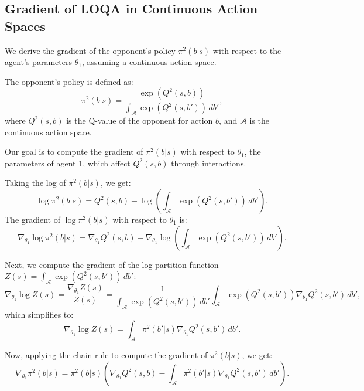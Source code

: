 \documentclass{article} \usepackage{iclr2025_conference,times}
\begin{document}
\subsection{Gradient of LOQA in Continuous Action Spaces}
\label{app:LOQA_continuous}

We derive the gradient of the opponent's policy \( \pi^2(b | s) \) with respect to the agent’s parameters \( \theta_1 \), assuming a continuous action space.

The opponent's policy is defined as:
\begin{equation}
    \pi^2(b | s) = \frac{\exp(Q^2(s, b))}{\int_{\mathcal{A}} \exp(Q^2(s, b')) \, db'},
\end{equation}
where \( Q^2(s, b) \) is the Q-value of the opponent for action \( b \), and \( \mathcal{A} \) is the continuous action space. 

Our goal is to compute the gradient of \( \pi^2(b | s) \) with respect to \( \theta_1 \), the parameters of agent 1, which affect \( Q^2(s, b) \) through interactions.

Taking the log of \( \pi^2(b | s) \), we get:
\begin{equation}
    \log \pi^2(b | s) = Q^2(s, b) - \log \left( \int_{\mathcal{A}} \exp(Q^2(s, b')) \, db' \right).
\end{equation}
The gradient of \( \log \pi^2(b | s) \) with respect to \( \theta_1 \) is:
\begin{equation}
    \nabla_{\theta_1} \log \pi^2(b | s) = \nabla_{\theta_1} Q^2(s, b) - \nabla_{\theta_1} \log \left( \int_{\mathcal{A}} \exp(Q^2(s, b')) \, db' \right).
\end{equation}

Next, we compute the gradient of the log partition function \( Z(s) = \int_{\mathcal{A}} \exp(Q^2(s, b')) \, db' \):
\begin{equation}
    \nabla_{\theta_1} \log Z(s) = \frac{\nabla_{\theta_1} Z(s)}{Z(s)} = \frac{1}{\int_{\mathcal{A}} \exp(Q^2(s, b')) \, db'} \int_{\mathcal{A}} \exp(Q^2(s, b')) \nabla_{\theta_1} Q^2(s, b') \, db',
\end{equation}
which simplifies to:
\begin{equation}
    \nabla_{\theta_1} \log Z(s) = \int_{\mathcal{A}} \pi^2(b' | s) \nabla_{\theta_1} Q^2(s, b') \, db'.
\end{equation}

Now, applying the chain rule to compute the gradient of \( \pi^2(b | s) \), we get:
\begin{equation}
    \nabla_{\theta_1} \pi^2(b | s) = \pi^2(b | s) \left( \nabla_{\theta_1} Q^2(s, b) - \int_{\mathcal{A}} \pi^2(b' | s) \nabla_{\theta_1} Q^2(s, b') \, db' \right).
\end{equation}
\end{document}
